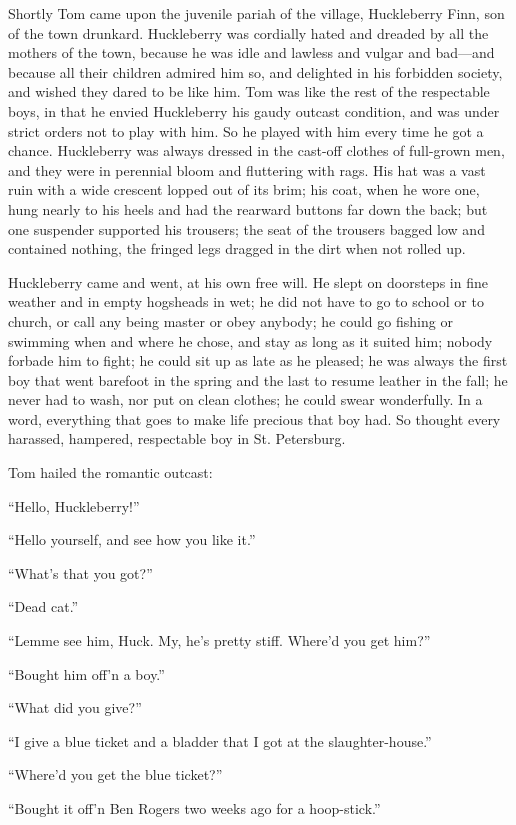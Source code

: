 \documentclass{book}
\begin{document}
Shortly Tom came upon the juvenile pariah of the village, Huckleberry Finn, son of the town drunkard. Huckleberry was cordially hated and dreaded by all the mothers of the town, because he was idle and lawless and vulgar and bad—and because all their children admired him so, and delighted in his forbidden society, and wished they dared to be like him. Tom was like the rest of the respectable boys, in that he envied Huckleberry his gaudy outcast condition, and was under strict orders not to play with him. So he played with him every time he got a chance. Huckleberry was always dressed in the cast-off clothes of full-grown men, and they were in perennial bloom and fluttering with rags. His hat was a vast ruin with a wide crescent lopped out of its brim; his coat, when he wore one, hung nearly to his heels and had the rearward buttons far down the back; but one suspender supported his trousers; the seat of the trousers bagged low and contained nothing, the fringed legs dragged in the dirt when not rolled up.

Huckleberry came and went, at his own free will. He slept on doorsteps in fine weather and in empty hogsheads in wet; he did not have to go to school or to church, or call any being master or obey anybody; he could go fishing or swimming when and where he chose, and stay as long as it suited him; nobody forbade him to fight; he could sit up as late as he pleased; he was always the first boy that went barefoot in the spring and the last to resume leather in the fall; he never had to wash, nor put on clean clothes; he could swear wonderfully. In a word, everything that goes to make life precious that boy had. So thought every harassed, hampered, respectable boy in St. Petersburg.

Tom hailed the romantic outcast:

“Hello, Huckleberry!”

“Hello yourself, and see how you like it.”

“What’s that you got?”

“Dead cat.”

“Lemme see him, Huck. My, he’s pretty stiff. Where’d you get him?”

“Bought him off’n a boy.”

“What did you give?”

“I give a blue ticket and a bladder that I got at the slaughter-house.”

“Where’d you get the blue ticket?”

“Bought it off’n Ben Rogers two weeks ago for a hoop-stick.”
\end{document}
